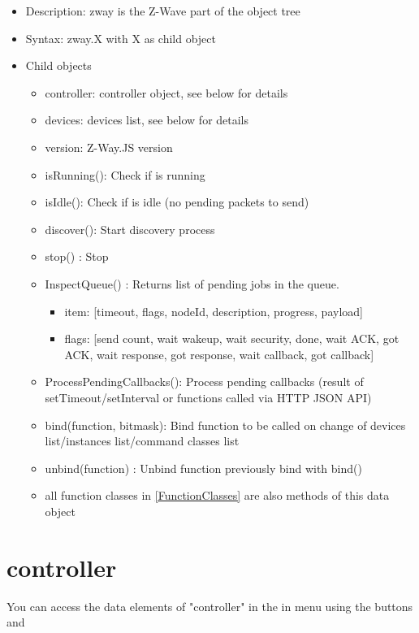 \begin {itemize}
\item Description: zway is the Z-Wave part of the object tree
\item Syntax:  zway.X with  X as child object
\item Child objects
\begin {itemize}
\item controller: controller object, see below for details
\item devices: devices list, see below for details
\item version: Z-Way.JS version
\item isRunning(): Check if \zway is running
\item isIdle(): Check if \zway is idle (no pending packets to send)
\item discover(): Start \zway discovery process
\item stop() : Stop \zway
\item InspectQueue() : Returns list of pending jobs in the queue.
\begin {itemize}
\item item: [timeout, flags, nodeId, description, progress, payload]
\item flags: [send count, wait wakeup, wait security, done, wait ACK, got ACK, wait response, got response, wait callback, got callback]
\end {itemize}
\item ProcessPendingCallbacks(): Process pending callbacks (result of setTimeout/setInterval or functions called via HTTP JSON API)
\item bind(function, bitmask): Bind function to be called on change of devices list/instances list/command classes list
\item unbind(function) : Unbind function previously bind with bind()
\item all function classes in \ref{FunctionClasses} are also methods of this data object
\end {itemize}
\end {itemize}

\section{controller}

You can access the data elements of "controller" in the \zweui in menu 
 using the buttons  
and 


